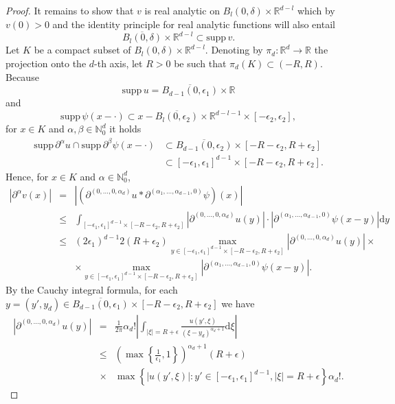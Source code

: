 \documentclass[10pt,a4paper]{amsart}
\newcommand{\N}{\mathbb{N}}
\newcommand{\R}{\mathbb{R}}
\newcommand{\supp}{\mbox{supp}\,}
\begin{document}
\begin{proof}
	It remains to show that $v$ is real analytic on $B_l(0,\delta)\times\R^{d-l}$ which by $v(0)>0$ and the identity principle for real analytic functions will also entail
	$$\overline{B_{l}(0,\delta)}\times\R^{d-l}\subset \supp v. $$
	Let $K$ be a compact subset of $B_l(0,\delta)\times\R^{d-l}$. Denoting by $\pi_d\colon \R^d\rightarrow\R$ the projection onto the $d$-th axis, let $R>0$ be such that $\pi_d(K)\subset(-R,R)$. Because
	\[\supp u= \overline{B_{d-1}(0,\epsilon_1)}\times\R\]
	and
	\[\supp\psi(x-\cdot)\subset x-\overline{B_l(0,\epsilon_2)}\times\R^{d-l-1}\times\left[-\epsilon_2,\epsilon_2\right],\]
	for $x\in K$ and $\alpha,\beta\in\N_0^d$ it holds
    \begin{align*}
        \supp \partial^\alpha u\cap\supp\partial^\beta\psi(x-\cdot)& \subset\overline{B_{d-1}(0,\epsilon_2)}\times [-R-\epsilon_2,R+\epsilon_2]\\
        &\subset [-\epsilon_1,\epsilon_1]^{d-1}\times [-R-\epsilon_2,R+\epsilon_2].
    \end{align*}
	Hence, for $x\in K$ and $\alpha\in\N_0^d$,
	\begin{eqnarray}\label{eq:real analyticity 1}
		|\partial^\alpha v(x)|
		&=&\left|\left(\partial^{(0,\ldots,0,\alpha_d)}u\ast\partial^{(\alpha_1,\ldots,\alpha_{d-1},0)}\psi\right)(x)\right|\nonumber\\
		&\leq&\int_{[-\epsilon_1,\epsilon_1]^{d-1}\times[-R-\epsilon_2,R+\epsilon_2]}|\partial^{(0,\ldots,0,\alpha_d)}u(y)|\cdot\left|\partial^{(\alpha_1,\ldots,\alpha_{d-1},0)}\psi(x-y)\right|\mathrm{d}y\nonumber\\
		&\leq& (2\epsilon_1)^{d-1}2(R+\epsilon_2) \max_{y\in [-\epsilon_1,\epsilon_1]^{d-1}\times[-R-\epsilon_2,R+\epsilon_2]}\left|\partial^{(0,\ldots,0,\alpha_d)}u(y)\right|\times\nonumber\\
		&&\times \max_{y\in [-\epsilon_1,\epsilon_1]^{d-1}\times[-R-\epsilon_2,R+\epsilon_2]}\left|\partial^{(\alpha_1,\ldots,\alpha_{d-1},0)}\psi(x-y)\right|.
	\end{eqnarray}
	By the Cauchy integral formula, for each $y=(y',y_d)\in \overline{B_{d-1}(0,\epsilon_1)}\times[-R-\epsilon_2,R+\epsilon_2]$ we have
	\begin{eqnarray}\label{eq:real analyticity 2}
		\left|\partial^{(0,\ldots,0,\alpha_d)}u(y)\right|
		&=&\frac{1}{2\pi}\alpha_d!\left|\int_{|\xi|=R+\epsilon}\frac{u(y',\xi)}{(\xi-y_d)^{\alpha_d+1}}\mathrm{d}\xi\right|\nonumber\\
		&\leq& \left(\max\left\{\frac{1}{\epsilon_1},1\right\}\right)^{\alpha_d+1}(R+\epsilon)\\
        &\times&\max\left\{|u(y',\xi)|\colon y'\in\left[-\epsilon_1,\epsilon_1\right]^{d-1},|\xi|=R+\epsilon\right\}\alpha_d!.\nonumber
	\end{eqnarray}
	

\end{proof}
\end{document}
